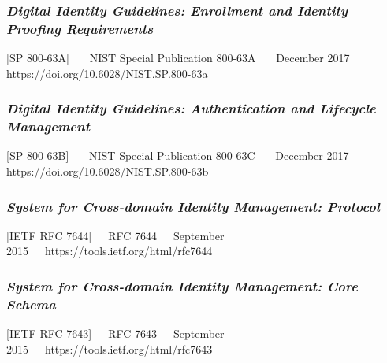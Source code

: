 \hypertarget{digital-identity-guidelines-enrollment-and-identity-proofing-requirements}{%
\subsubsection{\texorpdfstring{\emph{Digital Identity Guidelines: Enrollment
and Identity Proofing
Requirements}}{Digital Identity Guidelines: Enrollment and Identity Proofing Requirements}}\label{digital-identity-guidelines-enrollment-and-identity-proofing-requirements}}

{[}SP 800-63A{]}~~~ NIST Special Publication 800-63A~~~ December 2017~~~
https://doi.org/10.6028/NIST.SP.800-63a~~~

\hypertarget{digital-identity-guidelines-authentication-and-lifecycle-management-1}{%
\subsubsection{\texorpdfstring{\emph{Digital Identity Guidelines:
Authentication and Lifecycle
Management}}{Digital Identity Guidelines: Authentication and Lifecycle Management}}\label{digital-identity-guidelines-authentication-and-lifecycle-management-1}}

{[}SP 800-63B{]}~~~ NIST Special Publication 800-63C~~~ December 2017~~~
https://doi.org/10.6028/NIST.SP.800-63b~~~

\hypertarget{system-for-cross-domain-identity-management-protocol}{%
\subsubsection{\texorpdfstring{\emph{System for Cross-domain Identity
Management:
Protocol}}{System for Cross-domain Identity Management: Protocol}}\label{system-for-cross-domain-identity-management-protocol}}

{[}IETF RFC 7644{]}~~~RFC 7644~~~September
2015~~~https://tools.ietf.org/html/rfc7644

\hypertarget{system-for-cross-domain-identity-management-core-schema}{%
\subsubsection{\texorpdfstring{\emph{System for Cross-domain Identity
Management: Core
Schema}}{System for Cross-domain Identity Management: Core Schema}}\label{system-for-cross-domain-identity-management-core-schema}}

{[}IETF RFC 7643{]}~~~RFC 7643~~~September
2015~~~https://tools.ietf.org/html/rfc7643

